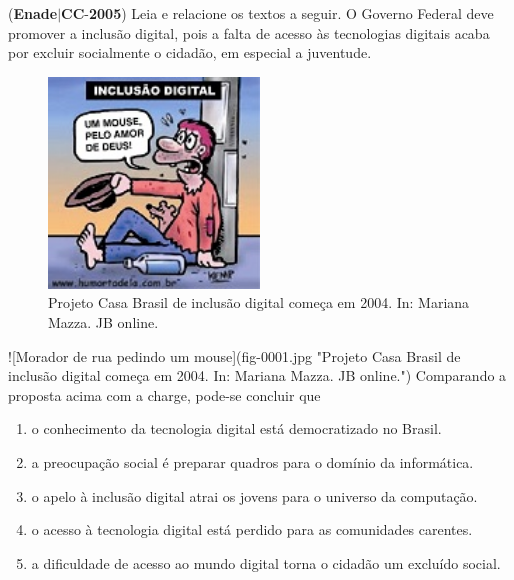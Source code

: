 \documentclass{exam}
\begin{document}
\begin{questions}
\question (\textbf{Enade}$|$\textbf{CC}-\textbf{2005}) Leia e relacione os textos a seguir.
O Governo Federal deve
promover a inclusão digital, pois
a falta de acesso às tecnologias
digitais acaba por excluir
socialmente o cidadão, em
especial a juventude.
\begin{figure}[H]
	\begin{center}
		\includegraphics[width=0.5\textwidth]{CIENCIA_DA_COMPUTACAO_Prova2005-utf8_figuras/fig-0001.jpg}
		\caption{Projeto Casa Brasil de inclusão digital começa em 2004. In: Mariana Mazza. JB online.}
	\end{center}
\end{figure}
![Morador de rua pedindo um mouse](fig-0001.jpg "Projeto Casa Brasil de inclusão digital começa em 2004. In: Mariana Mazza. JB online.")
Comparando a proposta acima com a charge, pode-se concluir que
	\begin{enumerate}[label=\alph*)]
		\item  o conhecimento da tecnologia digital está democratizado no
Brasil.
		\item  a preocupação social é preparar quadros para o domínio da
informática.
		\item  o apelo à inclusão digital atrai os jovens para o universo da
computação.
		\item  o acesso à tecnologia digital está perdido para as comunidades
carentes.
		\item  a dificuldade de acesso ao mundo digital torna o cidadão um
excluído social.

	\end{enumerate}


\end{questions}
\end{document}

